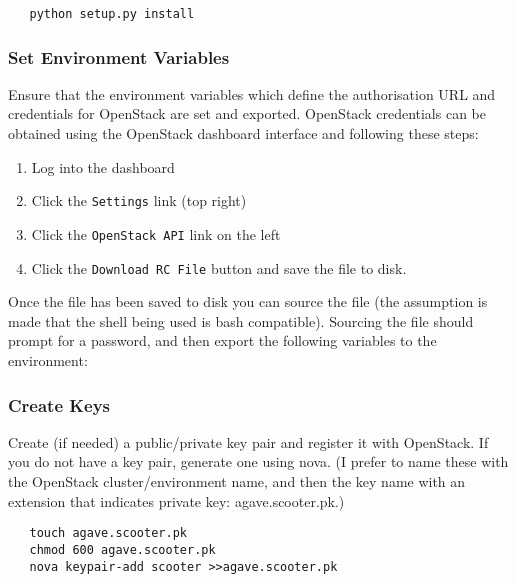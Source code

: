 \small\begin{verbatim}
   python setup.py install
\end{verbatim}\normalsize

\subsubsection{Set Environment Variables}
Ensure that the environment variables which define the authorisation URL and credentials for OpenStack are set and exported. 
OpenStack credentials can be obtained using the OpenStack dashboard interface and following these steps:
\label{set_env_sect} 
%
\begin{enumerate}
\item Log into the dashboard
\item Click the \verb!Settings! link (top right)
\item Click the \verb!OpenStack API! link on the left
\item Click the \verb!Download RC File! button and save the file to disk.
\end{enumerate}
%
Once the file has been saved to disk you can source the file (the assumption is made that the 
shell being used is bash compatible).
Sourcing the file should prompt for a password, and then export the following variables to the environment:


\dlbeg{1.2in}




\dlend

\subsubsection{Create Keys}
Create (if needed) a public/private key pair and register it with OpenStack.   If you do not have a key pair, generate one using
nova. (I prefer to name these with the OpenStack cluster/environment name, and then the key name with an extension that 
indicates private key: agave.scooter.pk.) 

\small\begin{verbatim}
   touch agave.scooter.pk
   chmod 600 agave.scooter.pk
   nova keypair-add scooter >>agave.scooter.pk
\end{verbatim}\normalsize

